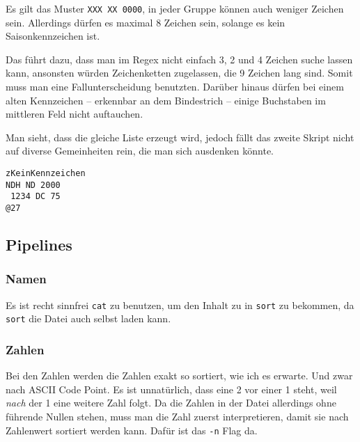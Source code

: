 \documentclass[12pt]{article}
\begin{document}
Es gilt das Muster \texttt{XXX XX 0000}, in jeder Gruppe können auch weniger Zeichen sein. Allerdings dürfen es maximal 8 Zeichen sein, solange es kein Saisonkennzeichen ist.

Das führt dazu, dass man im Regex nicht einfach 3, 2 und 4 Zeichen suche lassen kann, ansonsten würden Zeichenketten zugelassen, die 9 Zeichen lang sind. Somit muss man eine Fallunterscheidung benutzten. Darüber hinaus dürfen bei einem alten Kennzeichen -- erkennbar an dem Bindestrich -- einige Buchstaben im mittleren Feld nicht auftauchen.





Man sieht, dass die gleiche Liste erzeugt wird, jedoch fällt das zweite Skript nicht auf diverse Gemeinheiten rein, die man sich ausdenken könnte.

\begin{lstlisting}[caption=Gemeinheiten für Listing \ref{listing:auto-einfach}]
zKeinKennzeichen
NDH ND 2000
 1234 DC 75
@27
\end{lstlisting}

\subsection{Pipelines}
\subsubsection{Namen}


Es ist recht sinnfrei \texttt{cat} zu benutzen, um den Inhalt zu in \texttt{sort} zu bekommen, da \texttt{sort} die Datei auch selbst laden kann.




\subsubsection{Zahlen}



Bei den Zahlen werden die Zahlen exakt so sortiert, wie ich es erwarte. Und zwar nach ASCII Code Point. Es ist unnatürlich, dass eine 2 vor einer 1 steht, weil \textit{nach} der 1 eine weitere Zahl folgt. Da die Zahlen in der Datei allerdings ohne führende Nullen stehen, muss man die Zahl zuerst interpretieren, damit sie nach Zahlenwert sortiert werden kann. Dafür ist das \texttt{-n} Flag da.
\end{document}
